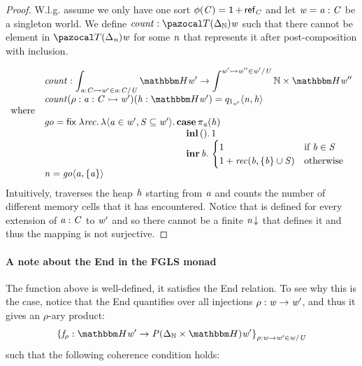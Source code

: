 \begin{proof}
W.l.g. assume we only have one sort $\phi(\mathit{C}) = \textsf{1} \,\textsf{$+$}\, \textsf{ref}_{\mathit{C}}$ and let $\mathit{w} = \mathit{a} : \mathit{C}$ be a singleton world. 
We define $\countFun : \monFLS(\Delta_\nat)\vw$ such that there cannot be element in $\monFLS(\Delta_\vn)\vw$ for some $\mathit{n}$ that represents it after post-composition with inclusion.

\[\begin{array}{ll}
    &\countFun : \End{\va : \vC \injto \vw' \in \commaC{\va : \vC}\vU} \heapF\vw' \to \Coend{\vw' \injto \vw'' \in \commaC{\vw'}\vU} \nat \times \heapF\vw'' \\
    &\countFun(\rho : \va : \vC \injto \vw')(\vh : \heapF\vw') = \quot{1_{\vw'}}\tup\vn\vh \\
    \text{where}& \\
                &  \mathit{go} = \mathsf{fix}\;\Lam{\mathit{rec}} \Lam{\tup{\va \in \vw'}{\vS \subseteq \vw'}} 
                                                                \CaseVertical{\proj\va(\vh)}
                                                                             {\InjL\Unit}{1}
                                                                             {\InjR\vb}{\begin{cases}1 & \text{if } \vb \in \vS \\
                                                                                                     1 + \mathit{rec}(\vb, \{ \vb \} \cup \vS)  & \text{otherwise}\end{cases}} \\
                &  \vn = \mathit{go}\tup\va{\{\va\}}
\end{array}\]
Intuitively, \countFun traverses the heap $\mathit{h}$ starting from $\mathit{a}$ and counts the number of different memory cells that it has encountered.
Notice that \countFun is defined for every extension of $\mathit{a} : \mathit{C}$ to $\mathit{w}'$ and so there cannot be a finite ${\mathit{n}\hspace{-2pt}\downarrow}$ that defines it and thus the mapping is not surjective.
\end{proof}

\paragraph{A note about the End in the FGLS monad}

The \countFun function above is well-defined, \ie it satisfies the End relation.
To see why this is the case, notice that the End quantifies over all injections $\rho : \mathit{w} \to \mathit{w}'$, and thus it gives an $\rho$-ary product: 
\[ \left\{\vf_\rho : \heapF\vw' \to \vP(\Delta_\nat \times \heapF)\vw'\right\}_{\rho : \vw \to \vw' \in \commaC\vw\vU} \]
such that the following coherence condition holds:

